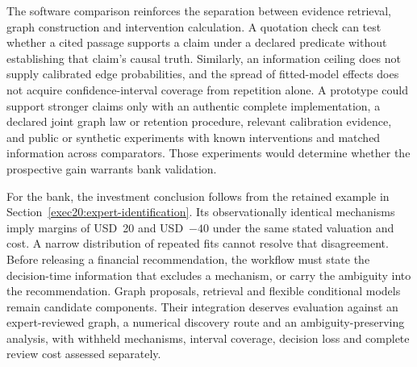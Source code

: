 The software comparison reinforces the separation between evidence retrieval,
graph construction and intervention calculation. A quotation check can test
whether a cited passage supports a claim under a declared predicate without
establishing that claim's causal truth. Similarly, an information ceiling does
not supply calibrated edge probabilities, and the spread of fitted-model
effects does not acquire confidence-interval coverage from repetition alone.
A prototype could support stronger claims only with an authentic complete
implementation, a declared joint graph law or retention procedure, relevant
calibration evidence, and public or synthetic experiments with known
interventions and matched information across comparators. Those experiments
would determine whether the prospective gain warrants bank validation.

For the bank, the investment conclusion follows from the retained example in
Section~\ref{exec20:expert-identification}. Its observationally identical
mechanisms imply margins of USD~20 and USD~$-40$ under the same stated
valuation and cost. A narrow distribution of repeated fits cannot resolve
that disagreement. Before releasing a financial recommendation, the workflow
must state the decision-time information that excludes a mechanism, or carry
the ambiguity into the recommendation. Graph proposals, retrieval and flexible
conditional models remain candidate components. Their integration deserves
evaluation against an expert-reviewed graph, a numerical discovery route and
an ambiguity-preserving analysis, with withheld mechanisms, interval coverage,
decision loss and complete review cost assessed separately.

